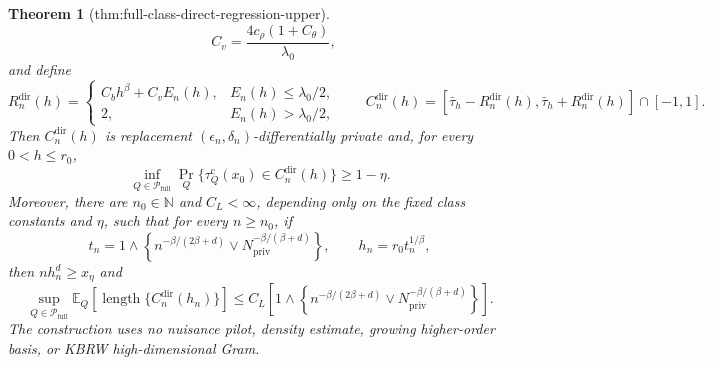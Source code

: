 \documentclass{article}
\newtheorem{theorem}{Theorem}
\begin{document}
\begin{theorem}[thm:full-class-direct-regression-upper]
\[ \qquad
 C_v=\frac{4c_\rho(1+C_\theta)}{\lambda_0},
\]
and define
\[
 R_n^{\mathrm{dir}}(h)=
 \begin{cases}
 C_bh^\beta+C_vE_n(h),&E_n(h)\le\lambda_0/2,\\
 2,&E_n(h)>\lambda_0/2,
 \end{cases}
 \qquad
 C_n^{\mathrm{dir}}(h)=
 [\bar\tau_h-R_n^{\mathrm{dir}}(h),\bar\tau_h+R_n^{\mathrm{dir}}(h)]\cap[-1,1].
\tag{17}
\]
Then \(C_n^{\mathrm{dir}}(h)\) is replacement \((\epsilon_n,\delta_n)\)-differentially private and, for every \(0<h\le r_0\),
\[
 \inf_{Q\in\mathcal P_{\mathrm{full}}}
 \Pr_Q\{\tau_Q^{\mathrm c}(x_0)\in C_n^{\mathrm{dir}}(h)\}\ge1-\eta.
\tag{18}
\]
Moreover, there are \(n_0\in\mathbb N\) and \(C_L<\infty\), depending only on the fixed class constants and \(\eta\), such that for every \(n\ge n_0\), if
\[
 t_n=1\wedge\left\{n^{-\beta/(2\beta+d)}
 \vee N_{\mathrm{priv}}^{-\beta/(\beta+d)}\right\},
 \qquad h_n=r_0t_n^{1/\beta},
\]
then \(nh_n^d\ge x_\eta\) and
\[
 \sup_{Q\in\mathcal P_{\mathrm{full}}}
 \mathbb E_Q[\operatorname{length}\{C_n^{\mathrm{dir}}(h_n)\}]
 \le C_L\left[1\wedge\left\{n^{-\beta/(2\beta+d)}
 \vee N_{\mathrm{priv}}^{-\beta/(\beta+d)}\right\}\right].
\tag{19}
\]
The construction uses no nuisance pilot, density estimate, growing higher-order basis, or KBRW high-dimensional Gram.
\end{theorem}
\end{document}
